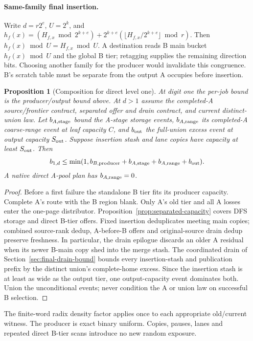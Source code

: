 \documentclass[11pt]{article}
\newtheorem{proposition}[theorem]{Proposition}
\theoremstyle{definition}
\theoremstyle{remark}
\begin{document}
\paragraph{Same-family final insertion.}
Write $d=r2^e$, $U=2^k$, and
$h_f(x)=(H_{f,x}\bmod2^{k+e})+2^{k+e}
(\lfloor H_{f,x}/2^{k+e}\rfloor\bmod r)$.
Then $h_f(x)\bmod U=H_{f,x}\bmod U$.
A destination reads B main bucket $h_f(x)\bmod U$ and the global B tier;
retagging supplies the remaining direction bits. Choosing another family
for the producer would invalidate this congruence. B's scratch table must
be separate from the output A occupies before insertion.

\begin{proposition}[Composition for direct level one]
\label{prop:level-one-composition}\label{cor:direct-plan-level-one}
At digit one the per-job bound is the producer/output bound above.
At $d>1$ assume the completed-A source/frontier contract, separated offer
and drain contract, and current distinct-union law. Let $b_{A,\rm stage}$
bound the A-stage storage events, $b_{A,\rm range}$ its completed-A
coarse-range event at leaf capacity $C$, and $b_{\rm out}$ the full-union
excess event at output capacity $S_{\rm out}$. Suppose insertion stash
and lane copies have capacity at least $S_{\rm out}$. Then
\[
 b_{1,d}\le\min(1,b_{B,\rm producer}+b_{A,\rm stage}
                         +b_{A,\rm range}+b_{\rm out}).
\]
A native direct A-pool plan has $b_{A,\rm range}=0$.
\end{proposition}
\begin{proof}
Before a first failure the standalone B tier fits its producer capacity.
Complete A's route with the B region blank. Only A's old tier and all
A losses enter the one-page distributor. Proposition~\ref{prop:separated-capacity}
covers DFS storage and direct B-tier offers. Fixed insertion deduplicates
meeting main copies; combined source-rank dedup, A-before-B offers and
original-source drain dedup preserve freshness. In particular, the drain
epilogue discards an older A residual when its newer B-main copy shed into
the merge stash.
The coordinated drain of Section~\ref{sec:final-drain-bound} bounds every
insertion-stash and publication prefix by the distinct union's complete-home
excess. Since the insertion stash is at least as wide as the output tier,
one output-capacity event dominates both. Union the unconditional events;
never condition the A or union law on successful B selection.
\end{proof}
The finite-word radix density factor applies once to each appropriate
old/current witness. The producer is exact binary uniform. Copies, pauses,
lanes and repeated direct B-tier scans introduce no new random exposure.
\end{document}
